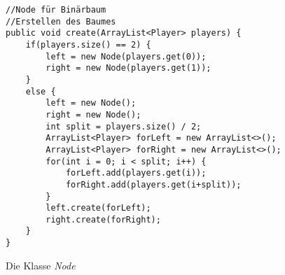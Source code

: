 \documentclass[a4paper, 12pt]{scrartcl}
\begin{document}
\begin{figure}[H]
    \centering
    \begin{lstlisting}
//Node für Binärbaum
//Erstellen des Baumes
public void create(ArrayList<Player> players) {
    if(players.size() == 2) {
        left = new Node(players.get(0));
        right = new Node(players.get(1));
    }
    else {
        left = new Node();
        right = new Node();
        int split = players.size() / 2;
        ArrayList<Player> forLeft = new ArrayList<>();
        ArrayList<Player> forRight = new ArrayList<>();
        for(int i = 0; i < split; i++) {
            forLeft.add(players.get(i));
            forRight.add(players.get(i+split));
        }
        left.create(forLeft);
        right.create(forRight);
    }
}
    \end{lstlisting}
    \caption{Die Klasse \emph{Node}}
\end{figure}
\end{document}

